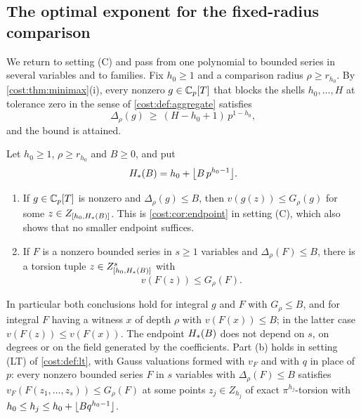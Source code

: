 \subsection{The optimal exponent for the fixed-radius comparison}\label{tors:sec:optimal}

We return to setting \textup{(C)} and pass from one polynomial to bounded series in several
variables and to families. Fix $h_0\ge1$ and a comparison radius $\rho\ge r_{h_0}$. By
\cref{cost:thm:minimax}\textup{(i)}, every nonzero $g\in\Cp[T]$ that blocks the shells
$h_0,\dots,H$ at tolerance zero in the sense of \cref{cost:def:aggregate} satisfies
\begin{equation}\label{tors:eq:budget}
  \Delta_\rho(g)\ \ge\ (H-h_0+1)\,p^{1-h_0},
\end{equation}
and the bound is attained.

\begin{theorem}\label{tors:thm:selection}
Let $h_0\ge1$, $\rho\ge r_{h_0}$ and $B\ge0$, and put
\[
  \torsHs(B)=h_0+\floor[\big]{B\,p^{h_0-1}} .
\]
\begin{enumerate}[label=\textup{(\alph*)}]
\item If $g\in\Cp[T]$ is nonzero and $\Delta_\rho(g)\le B$, then $v(g(z))\le G_\rho(g)$
  for some $z\in\torsZ{h_0}{\torsHs(B)}$. This is \cref{cost:cor:endpoint} in setting
  \textup{(C)}, which also shows that no smaller endpoint suffices.
\item If $F$ is a nonzero bounded series in $s\ge1$ variables and $\Delta_\rho(F)\le B$,
  there is a torsion tuple $z\in\torsZ{h_0}{\torsHs(B)}^s$ with
  \[
     v(F(z))\le G_\rho(F).
  \]
\end{enumerate}
In particular both conclusions hold for integral $g$ and $F$ with $G_\rho\le B$, and for
integral $F$ having a witness $x$ of depth $\rho$ with $v(F(x))\le B$; in the latter case
$v(F(z))\le v(F(x))$. The endpoint $\torsHs(B)$ does not depend on $s$, on degrees or on
the field generated by the coefficients.
\label{tors:cor:lt}Part \textup{(b)} holds in setting \textup{(LT)} of
\cref{cost:def:lt}, with Gauss valuations formed with $v_F$ and with $q$ in place of $p$:
every nonzero bounded series $F$ in $s$ variables with $\Delta_\rho(F)\le B$ satisfies
$v_F(F(z_1,\dots,z_s))\le G_\rho(F)$ at some points $z_j\in Z_{h_j}$ of exact
$\pi^{h_j}$-torsion with $h_0\le h_j\le h_0+\floor{Bq^{h_0-1}}$.
\end{theorem}

